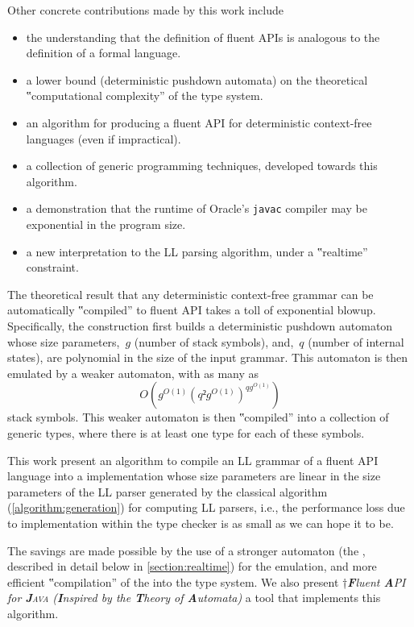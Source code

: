 Other concrete contributions made by this work include
\begin{itemize}
  \item the understanding that the definition of fluent APIs is analogous to
      the definition of a formal language.
  \item a lower bound (deterministic pushdown automata)
    on the theoretical ‟computational complexity” of the \Java type system.
  \item an algorithm for producing a fluent API for deterministic context-free languages (even if impractical).
  \item a collection of generic programming techniques, developed towards this algorithm.
  \item a demonstration that the runtime of Oracle's \texttt{javac} compiler may be exponential in the program size.
  \item a new interpretation to the LL parsing algorithm, under a ‟realtime” constraint.
\end{itemize}

The theoretical result that any deterministic context-free grammar can be
automatically ‟compiled” to fluent API takes a toll of exponential blowup.
Specifically, the construction first builds a deterministic pushdown automaton
whose size parameters,~$g$ (number of stack symbols), and,~$q$ (number of
internal states), are polynomial in the size of the input grammar. This
automaton is then emulated by a weaker automaton, with as many as
\[
  O\left(g^{O(1)}\left(q²g^{O(1)}\right)^{qg^{O(1)}}\right)
\]
stack symbols.
This weaker automaton is then ‟compiled” into a collection of generic \Java types,
where there is at least one type for each of these symbols.


This work present an algorithm to compile an LL grammar of a fluent API
language into a \Java implementation whose size parameters are linear in
the size parameters of the LL parser generated by the classical
algorithm (\cref{algorithm:generation}) for computing LL parsers,
i.e., the performance loss due to implementation within the \Java
type checker is as small as we can hope it to be.

The savings are made possible by the use of a stronger automaton (the \RLLp,
described in detail below in \cref{section:realtime}) for the emulation, and
more efficient ‟compilation” of the \RLLp into the \Java type system.
We also present \Fajita
†{\itshape \textbf Fluent \textbf API for \textbf J\textsc{ava}
  (\textbf Inspired by the \textbf Theory of \textbf Automata)
}
a \Java tool that implements this algorithm.

